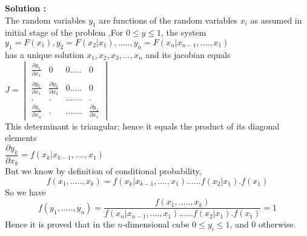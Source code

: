 \documentclass[journal,12pt,twocolumn]{IEEEtran}
\begin{document}
\medskip 


\textbf{Solution :}\\
The random variables $ y_{1} $ are functions of the random variables $ x_{i}$ as assumed in initial stage of the problem ,For $  0 \leq y \leq 1 $, the system  \\
$ y_{1}=F(x_{1}) ,y_{2}=F(x_{2}|x_{1}), ..... , y_{n}=F(x_{n}|x_{n-1},....,x_1{})  $\\
has a unique solution $ x_{1},x_{2},x_{3},...,x_{n} $ and its jacobian equals \\
$ J= \begin{vmatrix} \frac{ {\partial } y_{1}}{{ \partial } x_{1}}& 0 &0 .....&0 \\ \frac{{ \partial } y_{2}}{{\partial}x_{1}} & \frac{{\partial}y_{2}}{{\partial}x_{2}} &0 .....&0 \\ .&.&.......&. \\ \frac{{\partial}y_{n}}{{\partial}x_{n}} & . &.. .....& \frac{{\partial}y_{1}}{{\partial}x_{1}} \end{vmatrix}  $\\
This determinant is triangular; hence it equals the product of its diagonal elements \\
$ \dfrac{{\partial } y_{k}}{{\partial}x_{k}}=f(x_{k}|x_{k-1},....,x_{1}) $\\
But we know by definition of conditional probability,\\
\begin{equation}
	 f(x_{1},.....,x_{k})=f(x_{k}|x_{k-1},....,x_{1})......f(x_{2}|x_{1}).f(x_{1})
\end{equation}
So we have \\
\begin{equation}
	f(y_{1},.....,y_{n})=\dfrac{f(x_{1},.....,x_{k})}{f(x_{n}|x_{n-1},....,x_{1})......f(x_{2}|x_{1}).f(x_{1})}=1
\end{equation}
Hence it is proved that in the $ n $-dimensional cube $  0 \leq y_{i} \leq 1 $, and 0 otherwise. 
\end{document}
